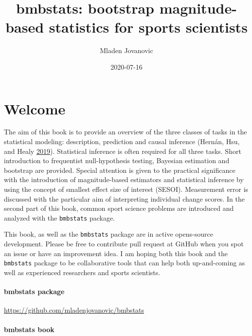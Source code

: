 \documentclass[
]{book}
\title{bmbstats: bootstrap magnitude-based statistics for sports scientists}
\author{Mladen Jovanovic}
\date{2020-07-16}
\begin{document}
\maketitle

{
\setcounter{tocdepth}{1}
\tableofcontents
}
\hypertarget{welcome}{%
\chapter*{Welcome}\label{welcome}}

The aim of this book is to provide an overview of the three classes of tasks in the statistical modeling: description, prediction and causal inference (Hernán, Hsu, and Healy \protect\hyperlink{ref-hernanSecondChanceGet2019}{2019}). Statistical inference is often required for all three tasks. Short introduction to frequentist null-hypothesis testing, Bayesian estimation and bootstrap are provided. Special attention is given to the practical significance with the introduction of magnitude-based estimators and statistical inference by using the concept of smallest effect size of interest (SESOI). Measurement error is discussed with the particular aim of interpreting individual change scores. In the second part of this book, common sport science problems are introduced and analyzed with the \texttt{bmbstats} package.

This book, as well as the \texttt{bmbstats} package are in active opens-source development. Please be free to contribute pull request at GitHub when you spot an issue or have an improvement idea. I am hoping both this book and the \texttt{bmbstats} package to be collaborative tools that can help both up-and-coming as well as experienced researchers and sports scientists.

\hypertarget{bmbstats-package}{%
\subsubsection*{bmbstats package}\label{bmbstats-package}}

\url{https://github.com/mladenjovanovic/bmbstats}

\hypertarget{bmbstats-book}{%
\subsubsection*{bmbstats book}\label{bmbstats-book}}
\end{document}
